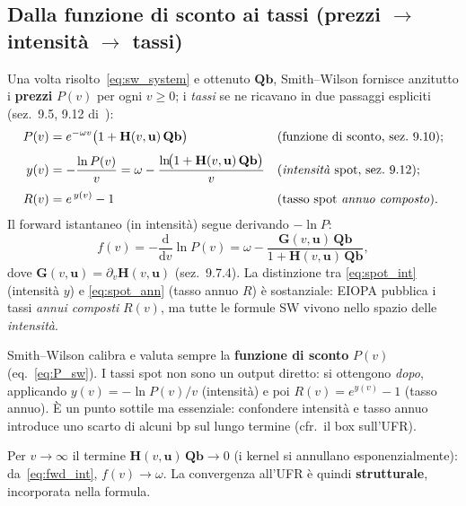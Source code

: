 \documentclass[11pt,a4paper]{article}
\theoremstyle{plain}
\theoremstyle{definition}
\theoremstyle{remark}
\newcommand{\bfb}{\mathbf{b}}
\newcommand{\bfu}{\mathbf{u}}
\newcommand{\Hmat}{\mathbf{H}}
\newcommand{\Qmat}{\mathbf{Q}}
\newcommand{\Gmat}{\mathbf{G}}
\begin{document}
\subsection{Dalla funzione di sconto ai tassi (prezzi $\to$ intensità $\to$ tassi)}

Una volta risolto~\eqref{eq:sw_system} e ottenuto $\Qmat\bfb$, Smith--Wilson
fornisce anzitutto i \textbf{prezzi} $P(v)$ per ogni $v\ge 0$; i \emph{tassi} se ne
ricavano in due passaggi espliciti (sez.~9.5, 9.12 di~\cite{eiopa2025}):
\begin{align}
  P(v) &= e^{-\omega v}\bigl(1+\Hmat(v,\bfu)\,\Qmat\bfb\bigr)
          &&\text{(funzione di sconto, sez.~9.10)};\label{eq:P_sw}\\[3pt]
  y(v) &= -\frac{\ln P(v)}{v} = \omega - \frac{\ln\!\bigl(1+\Hmat(v,\bfu)\,\Qmat\bfb\bigr)}{v}
          &&\text{(\emph{intensità} spot, sez.~9.12)};\label{eq:spot_int}\\[3pt]
  R(v) &= e^{\,y(v)} - 1
          &&\text{(tasso spot \emph{annuo composto})}.\label{eq:spot_ann}
\end{align}
Il forward istantaneo (in intensità) segue derivando $-\ln P$:
\begin{equation}
  \label{eq:fwd_int}
  f(v) = -\frac{\mathrm{d}}{\mathrm{d}v}\ln P(v)
       = \omega - \frac{\Gmat(v,\bfu)\,\Qmat\bfb}{1+\Hmat(v,\bfu)\,\Qmat\bfb},
\end{equation}
dove $\Gmat(v,\bfu)=\partial_v\Hmat(v,\bfu)$ (sez.~9.7.4). La distinzione tra
\eqref{eq:spot_int} (intensità $y$) e \eqref{eq:spot_ann} (tasso annuo $R$) è
sostanziale: EIOPA pubblica i tassi \emph{annui composti} $R(v)$, ma tutte le
formule SW vivono nello spazio delle \emph{intensità}.

\begin{keybox}
Smith--Wilson calibra e valuta sempre la \textbf{funzione di sconto} $P(v)$
(eq.~\eqref{eq:P_sw}). I tassi spot non sono un output diretto: si ottengono
\emph{dopo}, applicando $y(v)=-\ln P(v)/v$ (intensità) e poi $R(v)=e^{y(v)}-1$
(tasso annuo). È un punto sottile ma essenziale: confondere intensità e tasso annuo
introduce uno scarto di alcuni bp sul lungo termine (cfr.\ il box sull'UFR).
\end{keybox}

Per $v\to\infty$ il termine $\Hmat(v,\bfu)\,\Qmat\bfb\to 0$ (i kernel si annullano
esponenzialmente): da~\eqref{eq:fwd_int}, $f(v)\to\omega$. La convergenza all'UFR
è quindi \textbf{strutturale}, incorporata nella formula.
\end{document}
